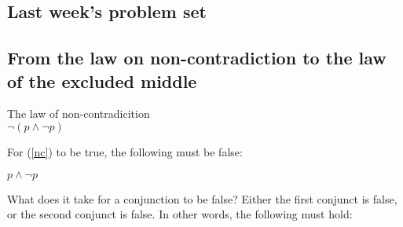 \documentclass[cronos,landscape,paper=letter]{ling-handout}
\begin{document}
{%









\printbibliography

\begin{appendix}

  \section{Last week's problem set}

\subsection{From the law on non-contradiction to the law of the excluded middle}

\ex\label{nc}The law of non-contradicition\\
\(¬ (p ∧ ¬ p)\)
\xe

For (\ref{nc}) to be true, the following must be false:

\ex
\(p ∧ ¬ p\)
\xe

What does it take for a conjunction to be false? Either the first conjunct is false, or the second conjunct is false. In other words, the following must hold:


\end{appendix}}
\end{document}

